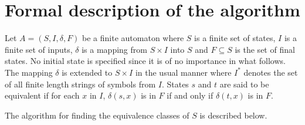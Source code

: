 \section{Formal description of the algorithm}

Let $A = (S,I,\delta,F)$ be a finite automaton where $S$ is a finite set of states, $I$ is a finite set of
inputs, $\delta$ is a mapping from $S \times I$ into $S$ and $F \subseteq S$ is the set of final states. No
initial state is
specified since it is of no importance in what follows. The mapping $\delta$ is extended to $S \times I$ in the usual
manner where $I^*$ denotes the set of all finite length strings of symbols from $I$. States $s$ and $t$ are
said to be equivalent if for each $x$ in $I$, $\delta (s,x)$ is in $F$ if and only if $\delta (t,x)$ is in $F$.

The algorithm for finding the equivalence classes of $S$ is described below.

